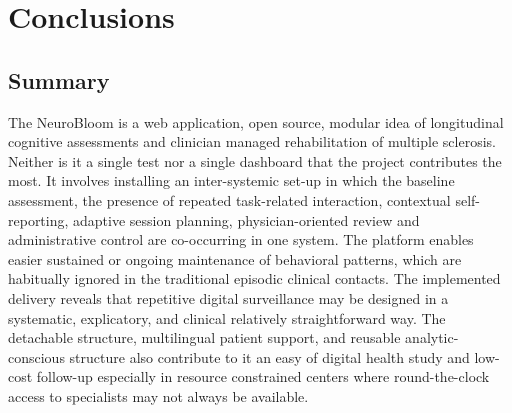 \documentclass[12pt,a4paper]{report}
\begin{document}
\chapter{Conclusions}

\section{Summary}
The NeuroBloom is a web application, open source, modular idea of longitudinal cognitive assessments and clinician managed rehabilitation of multiple sclerosis. Neither is it a single test nor a single dashboard that the project contributes the most. It involves installing an inter-systemic set-up in which the baseline assessment, the presence of repeated task-related interaction, contextual self-reporting, adaptive session planning, physician-oriented review and administrative control are co-occurring in one system. The platform enables easier sustained or ongoing maintenance of behavioral patterns, which are habitually ignored in the traditional episodic clinical contacts. The implemented delivery reveals that repetitive digital surveillance may be designed in a systematic, explicatory, and clinical relatively straightforward way. The detachable structure, multilingual patient support, and reusable analytic-conscious structure also contribute to it an easy of digital health study and low-cost follow-up especially in resource constrained centers where round-the-clock access to specialists may not always be available.
\end{document}
